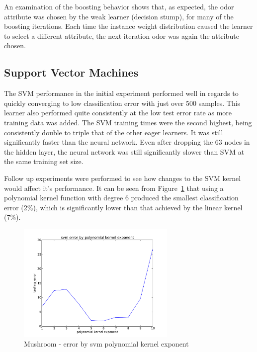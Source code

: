 \documentclass{sig-alternate}
\begin{document}
An examination of the boosting behavior shows that, as expected, the odor attribute was chosen by the weak learner (decision stump), for many of the boosting iterations. Each time the instance weight distribution caused the learner to select a different attribute, the next iteration odor was again the attribute chosen.


\subsection{Support Vector Machines}

The SVM performance in the initial experiment performed well in regards to quickly converging to low classification error with just over 500 samples. This learner also performed quite consistently at the low test error rate as more training data was added. The SVM training times were the second highest, being consistently double to triple that of the other eager learners. It was still significantly faster than the neural network. Even after dropping the 63 nodes in the hidden layer, the neural network was still significantly slower than SVM at the same training set size.

Follow up experiments were performed to see how changes to the SVM kernel would affect it's performance. It can be seen from Figure~\ref{ag-svm-poly} that using a polynomial kernel function with degree 6 produced the smallest classification error (2\%), which is significantly lower than that achieved by the linear kernel (7\%).

\begin{figure}[!htbp]
    \centering
    \includegraphics[width=3in]{data/agaricus-lepiota/svm/polynomial.pdf}
    \caption{Mushroom - error by svm polynomial kernel exponent \label{ag-svm-poly}}
\end{figure} 
\end{document}
